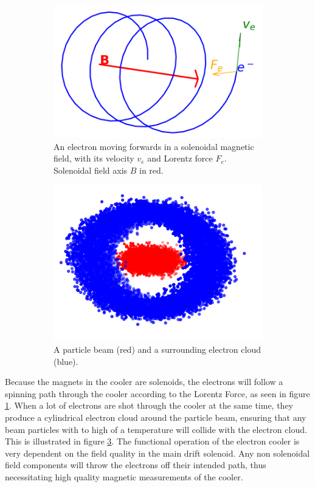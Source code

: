 \begin{figure}
    \centering
    \begin{subfigure}[b]{0.4\linewidth}
        \centering
        \includegraphics[width=0.9\linewidth]{figs/epath}
        \caption{An electron moving forwards in a solenoidal magnetic field,
        with its velocity $v_e$ and Lorentz force $F_e$. Solenoidal field axis $B$ in red.}
        \label{fig:epath}
    \end{subfigure}
    \hfill
    \begin{subfigure}[b]{0.4\linewidth}
        \centering
        \includegraphics[width=0.9\linewidth]{figs/ecloud}
        \caption{A particle beam (red) and a
        surrounding electron cloud (blue).}
        \label{fig:ecloud}
    \end{subfigure}
    \caption{}
\end{figure}

Because the magnets in the cooler are solenoids, the electrons will follow a
spinning path through the cooler according to the Lorentz Force, as seen in 
figure \ref{fig:epath}. When a lot of electrons are shot through the cooler at
the same time, they produce a cylindrical electron cloud around the particle
beam, ensuring that any beam particles with to high of a temperature will
collide with the electron cloud. \cite{Tranquille2018-fs}
This is illustrated in figure \ref{fig:ecloud}. The functional operation
of the electron cooler is very dependent on the field quality in the 
main drift solenoid. Any non solenoidal field components will throw 
the electrons off their intended path, thus necessitating high quality
magnetic measurements of the cooler.

